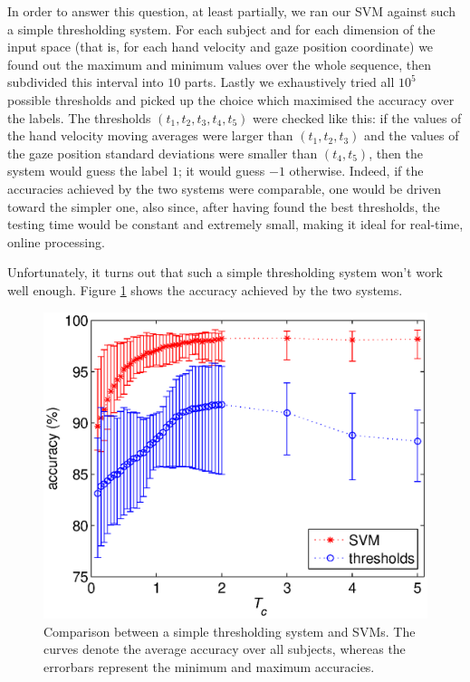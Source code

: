 \documentclass[a4paper,10pt,conference]{ieeeconf}
\begin{document}
In order to answer this question, at least partially, we ran our SVM
against such a simple thresholding system. For each subject and for
each dimension of the input space (that is, for each hand velocity and
gaze position coordinate) we found out the maximum and minimum values
over the whole sequence, then subdivided this interval into $10$
parts. Lastly we exhaustively tried all $10^5$ possible thresholds and
picked up the choice which maximised the accuracy over the labels. The
thresholds $(t_1,t_2,t_3,t_4,t_5)$ were checked like this: if the
values of the hand velocity moving averages were larger than
$(t_1,t_2,t_3)$ and the values of the gaze position standard
deviations were smaller than $(t_4,t_5)$, then the system would guess
the label $1$; it would guess $-1$ otherwise. Indeed, if the
accuracies achieved by the two systems were comparable, one would be
driven toward the simpler one, also since, after having found the best
thresholds, the testing time would be constant and extremely small,
making it ideal for real-time, online processing.

Unfortunately, it turns out that such a simple thresholding system
won't work well enough. Figure \ref{fig:comparison} shows the accuracy
achieved by the two systems.

\begin{figure}[htbp]
  \begin{center}
    \includegraphics[width=\linewidth]{comparison.eps}
    \caption{Comparison between a simple thresholding system and
    SVMs. The curves denote the average accuracy over all subjects,
    whereas the errorbars represent the minimum and maximum
    accuracies.}
    \label{fig:comparison}
  \end{center}
\end{figure}
\end{document}

